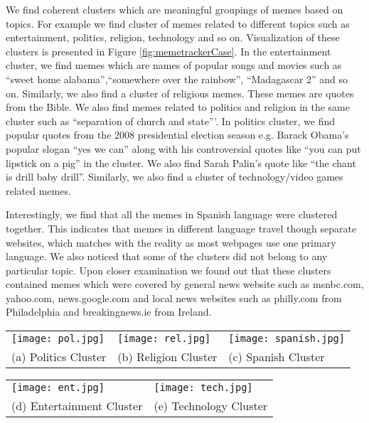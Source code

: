 \documentclass[sigconf]{acmart}
\newcommand{\memetracker}{{\tt MemeTracker}\xspace}
\begin{document}
 We find coherent clusters which are meaningful groupings of memes based on topics. For example we find cluster of memes related to different topics such as  entertainment, politics, religion, technology and so on. Visualization of these clusters is presented in Figure \ref{fig:memetrackerCase}. In the entertainment cluster, we find memes which are names of popular songs and movies such as ``sweet home alabama'',``somewhere over the rainbow'', ``Madagascar 2'' and so on. Similarly, we also find a cluster of religious memes. These memes are quotes from the Bible. We also find memes related to politics and religion in the same cluster such as ``separation of church and state'''. In politics cluster, we find popular quotes from the 2008 presidential election season e.g. Barack Obama's popular slogan ``yes we can'' along with his controversial quotes like ``you can put lipstick on a pig'' in the cluster. We also find Sarah Palin's quote like ``the chant is drill baby drill''. Similarly, we also find a cluster of technology/video games related memes. 
 
 Interestingly, we find that all the memes in Spanish language were clustered together. This indicates that memes in different language travel though separate websites, which matches with the reality as most webpages use one primary language. We also noticed that some of the clusters did not belong to any particular topic. Upon closer examination we found out that these clusters contained memes which were covered by general news website such as msnbc.com, yahoo.com, news.google.com and local news websites such as philly.com from Philadelphia and breakingnews.ie from Ireland.  


\begin{figure*}[htb]
\begin{center}

\begin{tabularx}{\textwidth}{>{\centering\arraybackslash}X>{\centering\arraybackslash}X>{\centering\arraybackslash}X}
		\texttt{[image: pol.jpg]} &
       \texttt{[image: rel.jpg]} &
       \texttt{[image: spanish.jpg]} \\
      (a) Politics Cluster  & (b) Religion Cluster & (c) Spanish Cluster 
    \end{tabularx}
\end{center}

\begin{center}

\begin{tabularx}{\textwidth}{>{\centering\arraybackslash}X>{\centering\arraybackslash}X}
       \texttt{[image: ent.jpg]} &
       \texttt{[image: tech.jpg]} \\
      (d) Entertainment Cluster & (e) Technology Cluster 
    \end{tabularx}
\end{center}
	\vspace{-0.1in}
\caption{\textbf{Different Clusters of Memes for the \memetracker dataset.}}
\label{fig:memetrackerCase}
	\vspace{-0.1in}
\end{figure*}
   
\end{document}
